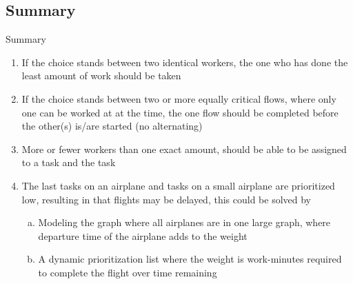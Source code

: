\subsection{Summary}
\begin{frame}{Summary}
\begin{enumerate}
\item If the choice stands between two identical workers, the one who has done the least amount of work should be taken
\item If the choice stands between two or more equally critical flows, where only one can be worked at at the time, the one flow should be completed before the other(s) is/are started (no alternating)
\item More or fewer workers than one exact amount, should be able to be assigned to a task and the task 
\item The last tasks on an airplane and tasks on a small airplane are prioritized low, resulting in that flights may be delayed, this could be solved by
\begin{enumerate}[a)]
\item Modeling the graph where all airplanes are in one large graph, where departure time of the airplane adds to the weight
\item A dynamic prioritization list where the weight is work-minutes required to complete the flight over time remaining
\end{enumerate}
\end{enumerate}
\end{frame}